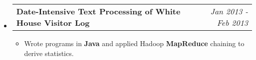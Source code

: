 \documentclass[letterpaper,11pt]{article}
\makeatletter
\newcommand{\resitem}[1]{\item[\ding{226}] #1 \vspace{-2pt}}
\newcommand{\ressubheading}[4]{
\begin{tabular*}{7.0in}{l@{\extracolsep{\fill}}r}
		\textbf{#1} & #2 \\
		\textit{#3} & \textit{#4} \\
\end{tabular*}\vspace{-6pt}}
\newcommand{\reslineheading}[2]{
\begin{tabular*}{7.0in}{l@{\extracolsep{\fill}}r}
		\textbf{#1} & #2 \\
\end{tabular*}\vspace{-6pt}}
\makeatother
\begin{document}
\begin{itemize}
\item
	\reslineheading{Date-Intensive Text Processing of White House Visitor Log}{\textit{Jan 2013 - Feb 2013}}
	\begin{itemize}
		\resitem{Wrote programs in \textbf{Java} and applied Hadoop \textbf{MapReduce} chaining to derive statistics.}%
	\end{itemize}


%
%

\end{itemize}
\end{document}
